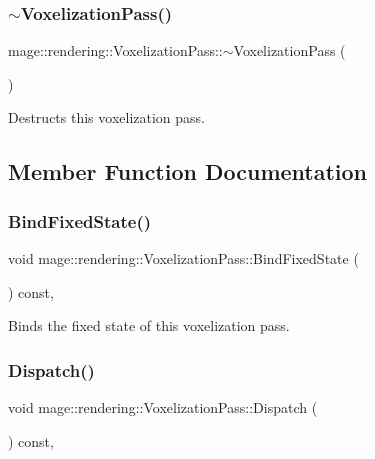 \subsubsection{\texorpdfstring{$\sim$\+Voxelization\+Pass()}{~VoxelizationPass()}}
{\footnotesize\ttfamily mage\+::rendering\+::\+Voxelization\+Pass\+::$\sim$\+Voxelization\+Pass (\begin{DoxyParamCaption}{ }\end{DoxyParamCaption})\hspace{0.3cm}{\ttfamily [default]}}

Destructs this voxelization pass. 

\subsection{Member Function Documentation}
\hypertarget{classmage_1_1rendering_1_1_voxelization_pass_ae69d6465ab918f12940339436fe56c56}{}\label{classmage_1_1rendering_1_1_voxelization_pass_ae69d6465ab918f12940339436fe56c56} 
\subsubsection{\texorpdfstring{Bind\+Fixed\+State()}{BindFixedState()}}
{\footnotesize\ttfamily void mage\+::rendering\+::\+Voxelization\+Pass\+::\+Bind\+Fixed\+State (\begin{DoxyParamCaption}{ }\end{DoxyParamCaption}) const\hspace{0.3cm}{\ttfamily [private]}, {\ttfamily [noexcept]}}

Binds the fixed state of this voxelization pass. \hypertarget{classmage_1_1rendering_1_1_voxelization_pass_a5026abcbe3aad3627e96ee055df8b842}{}\label{classmage_1_1rendering_1_1_voxelization_pass_a5026abcbe3aad3627e96ee055df8b842} 
\subsubsection{\texorpdfstring{Dispatch()}{Dispatch()}}
{\footnotesize\ttfamily void mage\+::rendering\+::\+Voxelization\+Pass\+::\+Dispatch (\begin{DoxyParamCaption}{ }\end{DoxyParamCaption}) const\hspace{0.3cm}{\ttfamily [private]}, {\ttfamily [noexcept]}}

